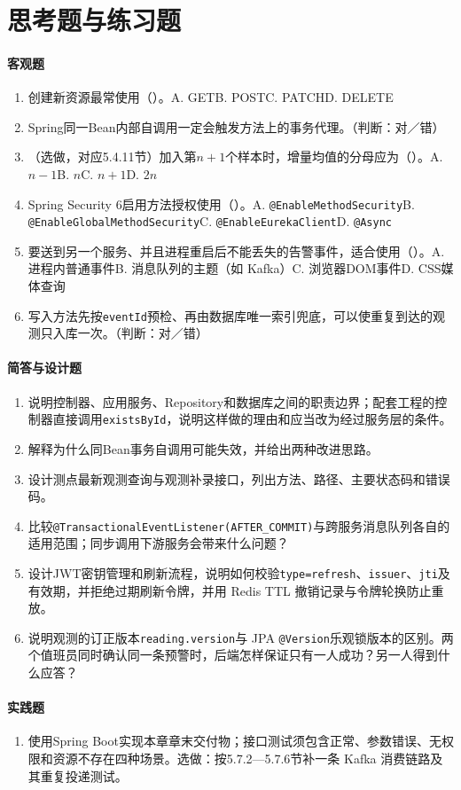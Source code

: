 \section*{思考题与练习题}

\paragraph{客观题}
\begin{enumerate}
\item 创建新资源最常使用（\quad）。A. GET\quad B. POST\quad C. PATCH\quad D. DELETE
\item Spring同一Bean内部自调用一定会触发方法上的事务代理。（判断：对／错）
\item （选做，对应5.4.11节）加入第$n+1$个样本时，增量均值的分母应为（\quad）。A. $n-1$\quad B. $n$\quad C. $n+1$\quad D. $2n$
\item Spring Security 6启用方法授权使用（\quad）。A. \texttt{@EnableMethodSecurity}\quad B. \texttt{@EnableGlobalMethodSecurity}\quad C. \texttt{@EnableEurekaClient}\quad D. \texttt{@Async}
\item 要送到另一个服务、并且进程重启后不能丢失的告警事件，适合使用（\quad）。A. 进程内普通事件\quad B. 消息队列的主题（如 Kafka）\quad C. 浏览器DOM事件\quad D. CSS媒体查询
\item 写入方法先按\texttt{eventId}预检、再由数据库唯一索引兜底，可以使重复到达的观测只入库一次。（判断：对／错）

\end{enumerate}

\paragraph{简答与设计题}
\begin{enumerate}[resume]
\item 说明控制器、应用服务、Repository和数据库之间的职责边界；配套工程的控制器直接调用\texttt{existsById}，说明这样做的理由和应当改为经过服务层的条件。
\item 解释为什么同Bean事务自调用可能失效，并给出两种改进思路。
\item 设计测点最新观测查询与观测补录接口，列出方法、路径、主要状态码和错误码。
\item 比较\texttt{@TransactionalEventListener(AFTER\_COMMIT)}与跨服务消息队列各自的适用范围；同步调用下游服务会带来什么问题？
\item 设计JWT密钥管理和刷新流程，说明如何校验\texttt{type=refresh}、\texttt{issuer}、\texttt{jti}及有效期，并拒绝过期刷新令牌，并用 Redis TTL 撤销记录与令牌轮换防止重放。
\item 说明观测的订正版本\texttt{reading.version}与 JPA \texttt{@Version}乐观锁版本的区别。两个值班员同时确认同一条预警时，后端怎样保证只有一人成功？另一人得到什么应答？

\end{enumerate}

\paragraph{实践题}
\begin{enumerate}[resume]
\item 使用Spring Boot实现本章章末交付物；接口测试须包含正常、参数错误、无权限和资源不存在四种场景。选做：按5.7.2—5.7.6节补一条 Kafka 消费链路及其重复投递测试。
\end{enumerate}
